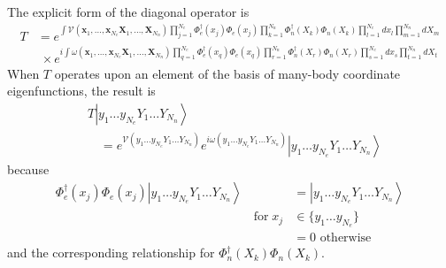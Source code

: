 \documentclass[aps,preprint]{revtex4}%
\begin{document}
The explicit form of the diagonal operator is
\begin{align}
T  &  =e^{\int\mathcal{V}(\mathbf{x}_{1},\ldots,\mathbf{x}_{N_{e}}%
\mathbf{X}_{1},\ldots,\mathbf{X}_{N_{n}})\prod\limits_{j=1}^{N_{e}}\Phi
_{e}^{\dagger}(x_{j})\Phi_{e}(x_{j})\prod\limits_{k=1}^{N_{n}}\Phi
_{n}^{\dagger}(X_{k})\Phi_{n}(X_{k})\prod\limits_{l=1}^{N_{e}}dx_{l}%
\prod_{m=1}^{N_{n}}dX_{m}}\nonumber\\
&  \;\times e^{i\int\omega(\mathbf{x}_{1},\ldots,\mathbf{x}_{N_{e}}%
\mathbf{X}_{1},\ldots,\mathbf{X}_{N_{n}})\prod\limits_{q=1}^{N_{e}}\Phi
_{e}^{\dagger}(x_{q})\Phi_{e}(x_{q})\prod\limits_{r=1}^{N_{n}}\Phi
_{n}^{\dagger}(X_{r})\Phi_{n}(X_{r})\prod\limits_{s=1}^{N_{e}}dx_{s}%
\prod_{t=1}^{N_{n}}dX_{t}} \label{Tdexplicit}%
\end{align}
When $T$ operates upon an element of the basis of many-body coordinate
eigenfunctions, the result is
\begin{align}
&  T\left|  y_{1}\ldots y_{N_{e}}Y_{1}\ldots Y_{N_{n}}\right\rangle
\nonumber\\
&  \quad=e^{\mathcal{V}(y_{1}\ldots y_{N_{e}}Y_{1}\ldots Y_{N_{n}})}%
e^{i\omega(y_{1}\ldots y_{N_{e}}Y_{1}\ldots Y_{N_{n}})}\left|  y_{1}\ldots
y_{N_{e}}Y_{1}\ldots Y_{N_{n}}\right\rangle \label{Tdcoord}%
\end{align}
because
\begin{align}
\Phi_{e}^{\dagger}(x_{j})\Phi_{e}(x_{j})\left|  y_{1}\ldots y_{N_{e}}%
Y_{1}\ldots Y_{N_{n}}\right\rangle  &  =\left|  y_{1}\ldots y_{N_{e}}%
Y_{1}\ldots Y_{N_{n}}\right\rangle \nonumber\\
\qquad\qquad\qquad\qquad\qquad\qquad\qquad\qquad\text{{for}}\;x_{j}  &
\in\{y_{1}\ldots y_{N_{e}}\}\nonumber\\
&  =0\,\,\text{o{therwise}}%
\end{align}
and the corresponding relationship for $\Phi_{n}^{\dagger}(X_{k})\Phi
_{n}(X_{k})$.
\end{document}
